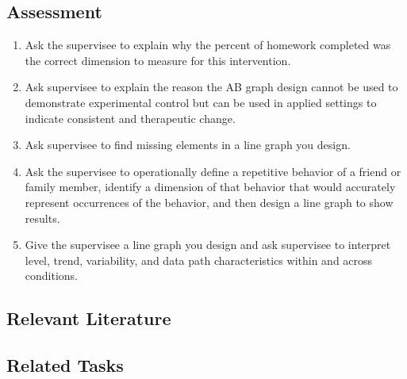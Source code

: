 \subsection{Assessment}
\begin{enumerate}
\item Ask the supervisee to explain why the percent of homework completed was the correct dimension to measure for this intervention.
\item Ask supervisee to explain the reason the AB graph design cannot be used to demonstrate experimental control but can be used in applied settings to indicate consistent and therapeutic change.
\item Ask supervisee to find missing elements in a line graph you design.
\item Ask the supervisee to operationally define a repetitive behavior of a friend or family member, identify a dimension of that behavior that would accurately represent occurrences of the behavior, and then design a line graph to show results.
\item Give the supervisee a line graph you design and ask supervisee to interpret level, trend, variability, and data path characteristics within and across conditions. 
\end{enumerate}
%
\subsection{Relevant Literature}
\begin{refsection}
\nocite{cooper2007applied,
    alberto2013applied,
    ledford2009single,
    vanselow2012online}
\printbibliography[heading=none]
\end{refsection}
%
\subsection{Related Tasks}
\fourhOne{}\\
\fourhTwo{}\\
\fourhThree{}\\
\fourhFour{}\\
\fourhFive{}\\
\fourFKFourtySeven{}\\
\fourjFifteen{}\\
%
%
%
%
%
\section[\fouraEleven{}]{\fouraEleven{}%
              }
